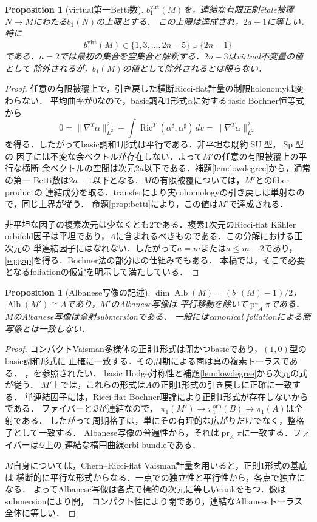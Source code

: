 \documentclass[12pt]{amsart}
\newtheorem{prop}[thm]{Proposition}
\theoremstyle{definition}
\theoremstyle{remark}
\numberwithin{equation}{section}
\DeclareMathOperator{\Ric}{Ric}
\DeclareMathOperator{\pr}{pr}
\DeclareMathOperator{\Alb}{Alb}
\newcommand{\orb}{\mathrm{orb}}
\newcommand{\virt}{\mathrm{virt}}
\newcommand{\SU}{\operatorname{SU}}
\newcommand{\Sp}{\operatorname{Sp}}
\newcommand{\Qfac}{\mathcal{Q}}
\begin{document}
\begin{prop}[virtual第一Betti数]\label{prop:virtual}
$b_1^{\virt}(M)$を，連結な有限正則\'etale被覆$N\to M$にわたる$b_1(N)$の上限とする．
この上限は達成され，$2a+1$に等しい．特に
\begin{equation}\label{eq:gap}
b_1^{\virt}(M)\in\{1,3,\ldots,2n-5\}\cup\{2n-1\}
\end{equation}
である．$n=2$では最初の集合を空集合と解釈する．$2n-3$はvirtual不変量の値として
除外されるが，$b_1(M)$の値として除外されるとは限らない．
\end{prop}
\begin{proof}
任意の有限被覆上で，引き戻した横断Ricci-flat計量の制限holonomyは変わらない．
平均曲率が0なので，basic調和1形式$\alpha$に対するbasic Bochner恒等式から
\[
0=\|\nabla^T\alpha\|_{L^2}^2+
\int\Ric^T(\alpha^\sharp,\alpha^\sharp)\,dv
=\|\nabla^T\alpha\|_{L^2}^2
\]
を得る．したがってbasic調和1形式は平行である．非平坦な既約$\SU$型，$\Sp$型の
因子には不変な余ベクトルが存在しない．よって$M'$の任意の有限被覆上の平行な横断
余ベクトルの空間は次元$2a$以下である．補題\ref{lem:lowdegree}から，通常の第一
Betti数は$2a+1$以下となる．$M$の有限被覆については，$M'$とのfiber productの
連結成分を取る．transferにより実cohomologyの引き戻しは単射なので，同じ上界が従う．
命題\ref{prop:betti}により，この値は$M'$で達成される．

非平坦な因子の複素次元は少なくとも2である．複素1次元のRicci-flat K\"ahler
orbifold因子は平坦であり，$A$に含まれるべきものである．この分解における正次元の
単連結因子にはなれない．したがって$a=m$または$a\leq m-2$であり，
\eqref{eq:gap}を得る．Bochner法の部分は\cite[Proposition 6.4]{Gomes}の仕組みでもある．
本稿では，そこで必要となるfoliationの仮定を明示して満たしている．
\end{proof}

\begin{prop}[Albanese写像の記述]\label{prop:alb}
$\dim\Alb(M)=(b_1(M)-1)/2$，$\Alb(M')\cong A$であり，$M'$のAlbanese写像は
平行移動を除いて$\pr_A\pi$である．$M$のAlbanese写像は全射submersionである．
一般にはcanonical foliationによる商写像とは一致しない．
\end{prop}
\begin{proof}
コンパクトVaisman多様体の正則1形式は閉かつbasicであり，$(1,0)$型のbasic調和形式に
正確に一致する．その周期による商は真の複素トーラスである．
\cite[Sections 2--3, Theorem 3.3]{Gomes}，\cite[Section 3]{IO}を参照されたい．
basic Hodge対称性と補題\ref{lem:lowdegree}から次元の式が従う．
$M'$上では，これらの形式は$A$の正則1形式の引き戻しに正確に一致する．
単連結因子には，Ricci-flat Bochner理論により正則1形式が存在しないからである．
ファイバーと$\Qfac$が連結なので，
$\pi_1(M')\to\pi_1^{\orb}(B)\to\pi_1(A)$は全射である．
したがって周期格子は，単にその有理的な広がりだけでなく，整格子として一致する．
Albanese写像の普遍性から，それは$\pr_A\pi$に一致する．ファイバーは$\Qfac$上の
連結な楕円曲線orbi-bundleである．

$M$自身については，Chern--Ricci-flat Vaisman計量を用いると，正則1形式の基底は
横断的に平行な形式からなる．一点での独立性と平行性から，各点で独立になる．
よってAlbanese写像は各点で標的の次元に等しいrankをもつ．像はsubmersionにより開，
コンパクト性により閉であり，連結なAlbaneseトーラス全体に等しい．
\end{proof}
\end{document}
